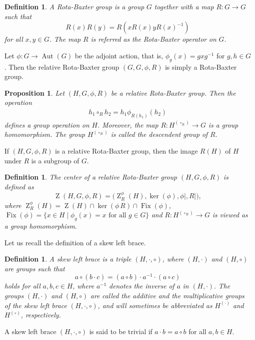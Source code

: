 \documentclass[11pt]{amsart}
\theoremstyle{thrm}
\theoremstyle{plain}
\newtheorem{prop}[thm]{Proposition}
\newtheorem{defn}[thm]{Definition}
\theoremstyle{definition}
\newcommand{\Z}{\operatorname{Z} }
\newcommand{\Fix}{\operatorname{Fix}}
\newcommand{\Aut}{\operatorname{Aut} }
\newcommand{\Ker}{\operatorname{ker} }
\numberwithin{equation}{section}
\begin{document}
\begin{defn}
A Rota-Baxter group is a group $G$ together with a map $R: G \rightarrow G$ such that
$$ R(x)  R(y)= R(x  R(x)  y  R(x)^{-1}) $$
for all $x, y \in G$. The map $R$ is referred as the Rota-Baxter operator on $G$.
\end{defn}
Let $\phi : G \rightarrow \Aut(G)$ be the adjoint action, that is, $\phi_g(x)=gxg^{-1}$ for $g, h \in G$. Then the relative Rota-Baxter group $(G, G, \phi, R)$ is simply a Rota-Baxter group.

\begin{prop}\label{R homo H to G} \cite[Proposition 3.5]{JYC22} 
Let $(H, G, \phi, R)$ be a relative Rota-Baxter group. Then the operation 
\begin{align}
h_1 \circ_R h_2 = h_1 \phi_{R(h_1)}(h_2)
\end{align}
defines a group operation on $H$.  Moreover, the map $R: H^{(\circ_R)} \rightarrow G$ is a group homomorphism. The group $H^{(\circ_R)}$ is called the descendent group of $R$.
\end{prop}

If  $(H, G, \phi, R)$ is a relative Rota-Baxter group, then the image $R(H)$ of $H$ under $R$ is  a subgroup of $G$.

\begin{defn}
	The center of a relative Rota-Baxter group $(H, G, \phi, R)$ is defined as
	$$\Z(H, G, \phi, R)= \big( \Z^{\phi}_R(H), \Ker(\phi), \phi|, R| \big),$$
	where $\Z^{\phi}_{R}(H)=\Z(H)  \cap \Ker(\phi \,R) \cap \Fix(\phi)$, $\Fix(\phi)= \{ x \in H  \mid \phi_g(x)=x \mbox{ for all } g \in G \}$ and  $R: H^{(\circ_R)} \rightarrow G$ is viewed as a group homomorphism.
\end{defn}

Let us recall the definition of a skew left brace.

\begin{defn}
	A skew left brace is a  triple $(H,\cdot ,\circ)$, where $(H,\cdot)$ and $(H, \circ)$ are groups  such that
	$$a \circ (b \cdot c)=(a\circ b) \cdot a^{-1} \cdot (a \circ c)$$
	holds for all $a,b,c \in H$, where $a^{-1}$ denotes the inverse of $a$ in $(H, \cdot)$. The groups $(H,\cdot)$ and $(H, \circ)$ are called the additive and the multiplicative groups of the skew left brace $(H, \cdot, \circ)$, and will sometimes be abbreviated as $H ^{(\cdot)}$ and  $H ^{(\circ)}$, respectively.
\end{defn}

A skew left brace $(H, \cdot, \circ)$  is said to be  trivial  if $a \cdot b= a \circ b$ for all $a, b \in H$.
\end{document}
